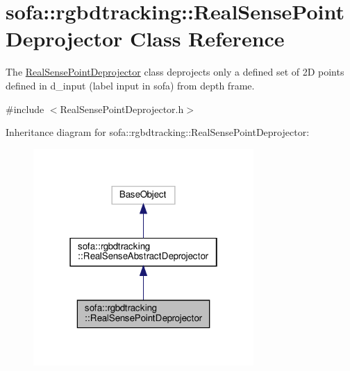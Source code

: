 \hypertarget{classsofa_1_1rgbdtracking_1_1_real_sense_point_deprojector}{}\section{sofa\+:\+:rgbdtracking\+:\+:Real\+Sense\+Point\+Deprojector Class Reference}
\label{classsofa_1_1rgbdtracking_1_1_real_sense_point_deprojector}


The \hyperlink{classsofa_1_1rgbdtracking_1_1_real_sense_point_deprojector}{Real\+Sense\+Point\+Deprojector} class deprojects only a defined set of 2D points defined in d\+\_\+input (label input in sofa) from depth frame.  




{\ttfamily \#include $<$Real\+Sense\+Point\+Deprojector.\+h$>$}



Inheritance diagram for sofa\+:\+:rgbdtracking\+:\+:Real\+Sense\+Point\+Deprojector\+:\nopagebreak
\begin{figure}[H]
\begin{center}
\leavevmode
\includegraphics[width=238pt]{classsofa_1_1rgbdtracking_1_1_real_sense_point_deprojector__inherit__graph}
\end{center}
\end{figure}


